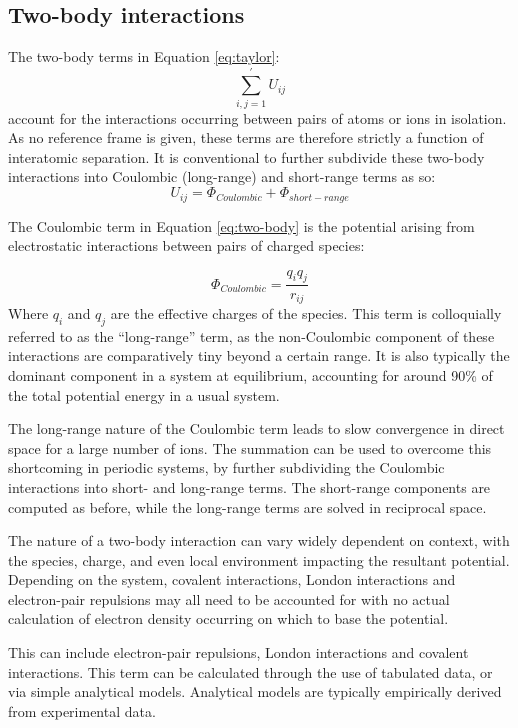 \subsection{Two-body interactions}
The two-body terms in Equation \ref{eq:taylor}: 
\begin{equation}
\sum_{i,j = 1}^\prime U_{ij}
\end{equation}
account for the interactions occurring between pairs of atoms or ions in isolation.
As no reference frame is given, these terms are therefore strictly a function of interatomic separation.
It is conventional to further subdivide these two-body interactions into Coulombic (long-range) and short-range terms as so:
\begin{equation}
U_{ij} = \Phi_{Coulombic} + \Phi_{short-range}
\label{eq:two-body}
\end{equation}

The Coulombic term in Equation \ref{eq:two-body} is the potential arising from electrostatic interactions between pairs of charged species:

\begin{equation}
\Phi_{Coulombic} = \frac{q_iq_j}{r_{ij}}
\label{eq:coulombic}
\end{equation}
Where $q_i$ and $q_j$ are the effective charges of the species.
This term is colloquially referred to as the ``long-range'' term, as the non-Coulombic component of these interactions are comparatively tiny beyond a certain range.
It is also typically the dominant component in a system at equilibrium, accounting for around 90\% of the total potential energy in a usual system.\cite{Catlow2013}

The long-range nature of the Coulombic term leads to slow convergence in direct space for a large number of ions.
The \citet{Ewald1921} summation can be used to overcome this shortcoming in periodic systems, by further subdividing the Coulombic interactions into short- and long-range terms.
The short-range components are computed as before, while the long-range terms are solved in reciprocal space.

The nature of a two-body interaction can vary widely dependent on context, with the species, charge, and even local environment impacting the resultant potential.
Depending on the system, covalent interactions, London interactions and electron-pair repulsions may all need to be accounted for with no actual calculation of electron density occurring on which to base the potential.

This can include electron-pair repulsions, London interactions and covalent interactions.
This term can be calculated through the use of tabulated data, or via simple analytical models.
Analytical models are typically empirically derived from experimental data.

